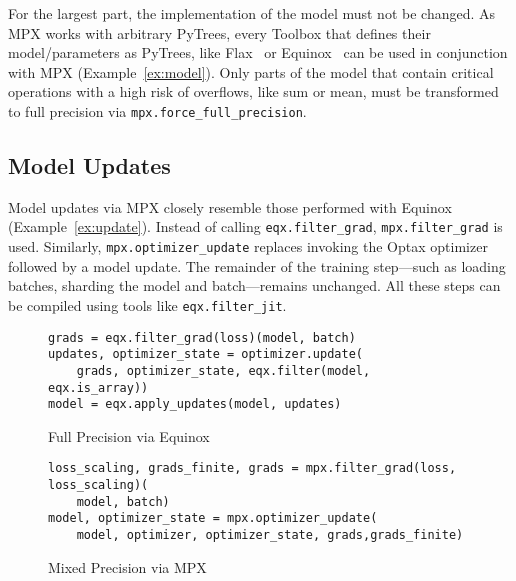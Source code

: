\documentclass[copyright, logo]{dsme}
\newcommand{\mpx}{\textsc{MPX}}
\begin{document}
For the largest part, the implementation of the model must not be changed.
As \mpx{} works with arbitrary PyTrees, every Toolbox that defines their model/parameters as PyTrees, like Flax~\citep{flax2020github} or Equinox~\citep{kidger2021equinox} can be used in conjunction with \mpx{} (Example~\ref{ex:model}). 
Only parts of the model that contain critical operations with a high risk of overflows, like sum or mean, must be transformed to full precision via \texttt{mpx.force\_full\_precision}.


\subsection{Model Updates}
\label{sec:eqxvsmpxmodelupdate}
Model updates via \mpx{} closely resemble those performed with Equinox (Example~\ref{ex:update}). 
Instead of calling \texttt{eqx.filter\_grad}, \texttt{mpx.filter\_grad} is used. Similarly, \texttt{mpx.optimizer\_update} replaces invoking the Optax optimizer followed by a model update.
The remainder of the training step—such as loading batches, sharding the model and batch—remains unchanged. 
All these steps can be compiled using tools like \texttt{eqx.filter\_jit}.


\begin{example}[h]
    \centering
    \begin{subfigure}[t]{0.98\textwidth}
        \centering
        \begin{pbox}[]{}
            \begin{verbatim}
grads = eqx.filter_grad(loss)(model, batch)
updates, optimizer_state = optimizer.update(
    grads, optimizer_state, eqx.filter(model, eqx.is_array))
model = eqx.apply_updates(model, updates)
        \end{verbatim}
    \end{pbox}
        \caption{Full Precision via Equinox}
    \end{subfigure}\hspace{0.1cm}
    \begin{subfigure}[t]{0.98\textwidth}
        \centering
        \begin{pbox}[]{}
            \begin{verbatim}
loss_scaling, grads_finite, grads = mpx.filter_grad(loss, loss_scaling)(
    model, batch)
model, optimizer_state = mpx.optimizer_update(
    model, optimizer, optimizer_state, grads,grads_finite)
            \end{verbatim}
            \end{pbox}
            \caption{Mixed Precision via \mpx{}}
    \end{subfigure}
    \caption{Implementation of model updates via Equinox and \mpx{}. \mpx{} is designed such that its model update routine closely resembles the one of Equinox.}
    \label{ex:update}
\end{example}
\end{document}
